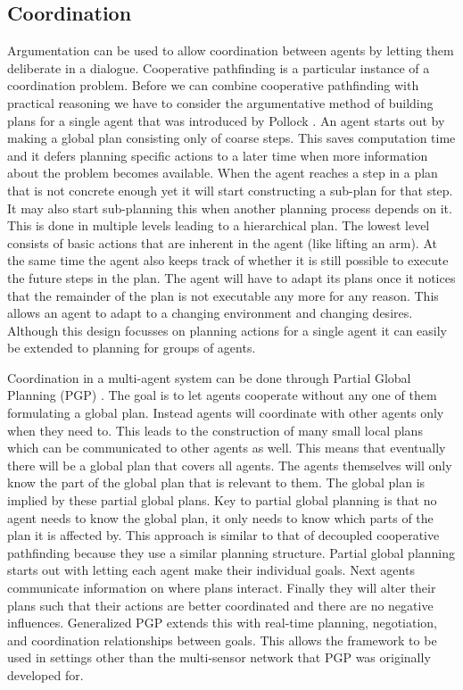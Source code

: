 \subsection{Coordination}
Argumentation can be used to allow coordination between agents by letting them
deliberate in a dialogue. Cooperative pathfinding is a particular instance of a
coordination problem. Before we can combine cooperative pathfinding with
practical reasoning we have to consider the
argumentative method of building plans for a single agent that was introduced
by Pollock \cite{pollock1995}. An agent starts out by making a global plan
consisting only of coarse steps. This saves computation time and it defers
planning specific actions to a later time when more information about the
problem becomes available. When the agent reaches a step in a plan that is not
concrete enough yet it will start constructing a sub-plan for that step. It may
also start sub-planning this when another planning process depends on it. This
is done in
multiple levels leading to a hierarchical plan. The lowest level consists of
basic actions that are inherent in the agent (like lifting an arm). At the same
time the agent also keeps track of whether it is still possible to execute the
future steps in the plan. The agent will have to adapt its plans once it
notices that the remainder of the plan is not executable any more for any
reason. This allows an agent to adapt to a changing environment and changing
desires. Although this design focusses on planning actions for a single agent
it can easily be extended to planning for groups of agents.

Coordination in a multi-agent system can be done through Partial Global
Planning (PGP) \cite[pp. 202--204]{durfee1991,decker1992,woodridge2009}. The
goal is to
let agents cooperate without any one of them formulating a global plan. Instead
agents will coordinate with other agents only when they need to. This leads to
the construction of many small local plans which can be communicated to other
agents as well. This means that eventually there will be a global plan that
covers all agents. The agents themselves will only know the part of the global
plan that is relevant to them. The global plan is implied by these partial
global plans. Key to
partial global planning is that no agent needs to know the global plan, it only
needs to know which parts of the plan it is affected by. This approach is
similar to that of decoupled cooperative pathfinding because they use a similar
planning structure. Partial global planning starts out with letting each agent
make their individual goals. Next agents communicate information on where plans
interact. Finally they will alter their plans such that their actions are
better coordinated and there are no negative influences. Generalized PGP
\cite{decker1992} extends this with real-time planning, negotiation, and
coordination relationships between goals. This allows the framework to be used
in settings other than the multi-sensor network that PGP was originally
developed for.

